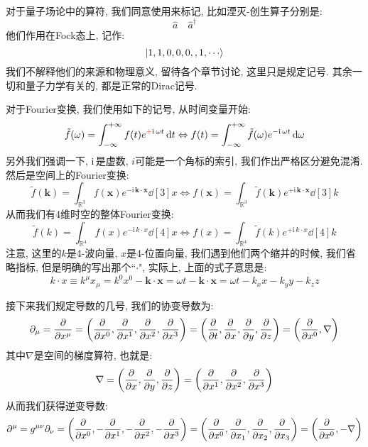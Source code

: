 对于量子场论中的算符, 我们同意使用$\hat{}$来标记, 比如湮灭-创生算子分别是:
\begin{equation}
  \hat{a} \quad \hat{a}^\dagger
\end{equation}
他们作用在Fock态上, 记作:
\begin{equation}
  \ket{1, 1, 0, 0, 0, ,1, \cdots}
\end{equation}
我们不解释他们的来源和物理意义, 留待各个章节讨论, 这里只是规定记号.
其余一切和量子力学有关的, 都是正常的Dirac记号.

对于Fourier变换, 我们使用如下的记号, 从时间变量开始:
\begin{equation}
  \tilde{f}(\omega) = \int_{-\infty}^{+\infty} f(t) e^{\fr{+}\mathrm{i}\, \omega t} \dd{t} \Leftrightarrow
  f(t) = \int_{-\infty}^{+\infty} \tilde{f}(\omega) e^{-\mathrm{i}\, \omega t} \dd{\omega}
\end{equation}
另外我们强调一下, $\mathrm{i}\,$是虚数, $i$可能是一个角标的索引, 我们作出严格区分避免混淆.
然后是空间上的Fourier变换:
\begin{equation}
  \tilde{f}(\bm{k}) = \int_{\mathbb{R}^3} f(\bm{x}) e^{-\mathrm{i}\, \bm{k} \cdot \bm{x}} \dd[3]{x} \Leftrightarrow
  f(\bm{x}) = \int_{\mathbb{R}^3} \tilde{f}(\bm{k}) e^{+\mathrm{i}\, \bm{k} \cdot \bm{x}} \dd[3]{k}
\end{equation}
从而我们有4维时空的整体Fourier变换:
\begin{equation}
  \tilde{f}(k) = \int_{\mathbb{R}^4} f(x) e^{-\mathrm{i}\, k \cdot x} \dd[4]{x} \Leftrightarrow
  f(x) = \int_{\mathbb{R}^4} \tilde{f}(k) e^{+\mathrm{i}\, k \cdot x} \dd[4]{k}
\end{equation}
注意, 这里的$k$是4-波向量, $x$是4-位置向量, 我们遇到他们两个缩并的时候, 我们省略指标, 但是明确的写出那个``$\cdot$", 实际上, 上面的式子意思是:
\begin{equation}
 k\cdot x \equiv k^\mu x_\mu = k^0 x^0 - \bm{k} \cdot \bm{x} = \omega t - \bm{k} \cdot \bm{x} = \omega t - k_x x - k_y y - k_z z
\end{equation}

接下来我们规定导数的几号, 我们的协变导数为:
\begin{equation}
  \partial_\mu = \frac{\partial}{\partial x^\mu} = \left( \frac{\partial}{\partial x^0}, \frac{\partial}{\partial x^1}, \frac{\partial}{\partial x^2}, \frac{\partial}{\partial x^3} \right) = \left( \frac{\partial}{\partial t}, \frac{\partial}{\partial x}, \frac{\partial}{\partial y}, \frac{\partial}{\partial z} \right) = \left(\pdv{}{x^0}, \nabla\right)
\end{equation}
其中$\nabla$是空间的梯度算符, 也就是:
\begin{equation}
  \nabla = \left( \frac{\partial}{\partial x}, \frac{\partial}{\partial y}, \frac{\partial}{\partial z} \right) = \left( \pdv{}{x^1}, \pdv{}{x^2}, \pdv{}{x^3} \right)
\end{equation}
从而我们获得逆变导数:
\begin{equation}
  \partial^\mu = g^{\mu\nu} \partial_\nu = \left( \frac{\partial}{\partial x^0}, -\frac{\partial}{\partial x^1}, -\frac{\partial}{\partial x^2}, -\frac{\partial}{\partial x^3} \right)= \left( \pdv{}{x^0}, \pdv{}{x_1}, \pdv{}{x_2}, \pdv{}{x_3} \right) = \left( \pdv{}{x^0}, -\nabla \right) 
\end{equation}


